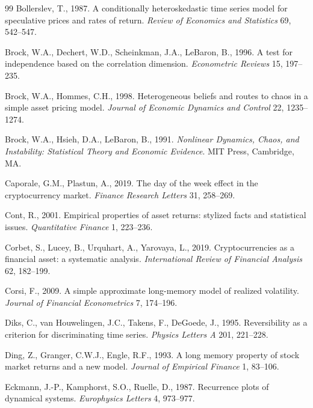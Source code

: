\documentclass[11pt,a4paper]{article}
\begin{document}
\begin{thebibliography}{99}
Bollerslev, T., 1987. A conditionally heteroskedastic time series model for speculative prices and rates of return.
\emph{Review of Economics and Statistics} 69, 542--547.

Brock, W.A., Dechert, W.D., Scheinkman, J.A., LeBaron, B., 1996. A test for independence based on the correlation
dimension. \emph{Econometric Reviews} 15, 197--235.

Brock, W.A., Hommes, C.H., 1998. Heterogeneous beliefs and routes to chaos in a simple asset pricing model.
\emph{Journal of Economic Dynamics and Control} 22, 1235--1274.

Brock, W.A., Hsieh, D.A., LeBaron, B., 1991. \emph{Nonlinear Dynamics, Chaos, and Instability: Statistical Theory and
Economic Evidence}. MIT Press, Cambridge, MA.

Caporale, G.M., Plastun, A., 2019. The day of the week effect in the cryptocurrency market. \emph{Finance Research
Letters} 31, 258--269.

Cont, R., 2001. Empirical properties of asset returns: stylized facts and statistical issues. \emph{Quantitative
Finance} 1, 223--236.

Corbet, S., Lucey, B., Urquhart, A., Yarovaya, L., 2019. Cryptocurrencies as a financial asset: a systematic analysis.
\emph{International Review of Financial Analysis} 62, 182--199.

Corsi, F., 2009. A simple approximate long-memory model of realized volatility. \emph{Journal of Financial
Econometrics} 7, 174--196.

Diks, C., van Houwelingen, J.C., Takens, F., DeGoede, J., 1995. Reversibility as a criterion for discriminating time
series. \emph{Physics Letters A} 201, 221--228.

Ding, Z., Granger, C.W.J., Engle, R.F., 1993. A long memory property of stock market returns and a new model.
\emph{Journal of Empirical Finance} 1, 83--106.

Eckmann, J.-P., Kamphorst, S.O., Ruelle, D., 1987. Recurrence plots of dynamical systems. \emph{Europhysics Letters}
4, 973--977.


\end{thebibliography}
\end{document}
